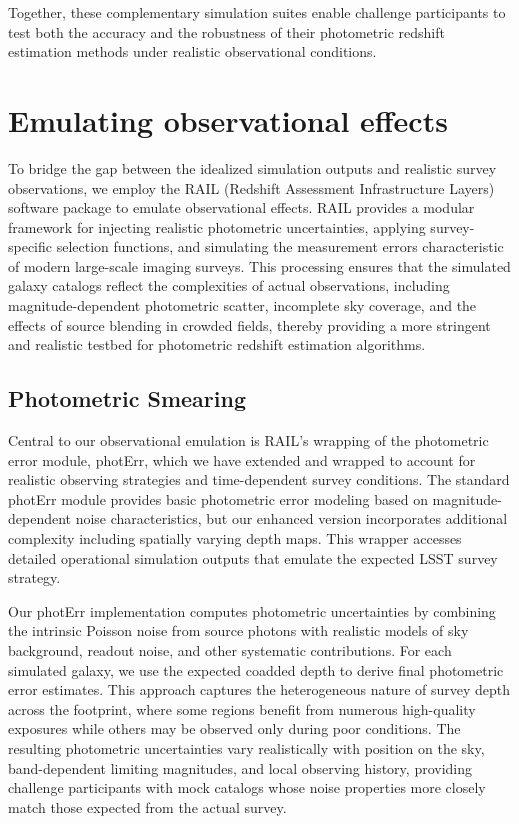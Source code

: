 \documentclass[11pt,twoside,letterpaper,onecolumn,english]{article}
\begin{document}
Together, these complementary simulation suites enable challenge
participants to test both the accuracy and the robustness of their
photometric redshift estimation methods under realistic observational
conditions.


\section{Emulating observational effects}
\label{sec:emulating_observations}

To bridge the gap between the idealized simulation outputs and
realistic survey observations, we employ the RAIL (Redshift Assessment
Infrastructure Layers) software package to emulate observational
effects. RAIL provides a modular framework for injecting realistic
photometric uncertainties, applying survey-specific selection
functions, and simulating the measurement errors characteristic of
modern large-scale imaging surveys. This processing ensures that the
simulated galaxy catalogs reflect the complexities of actual
observations, including magnitude-dependent photometric scatter,
incomplete sky coverage, and the effects of source blending in crowded
fields, thereby providing a more stringent and realistic testbed for
photometric redshift estimation algorithms.


\subsection{Photometric Smearing}

Central to our observational emulation is RAIL's wrapping of the
photometric error module, photErr, which we have extended and wrapped
to account for realistic observing strategies and time-dependent
survey conditions. The standard photErr module provides basic
photometric error modeling based on magnitude-dependent noise
characteristics, but our enhanced version incorporates additional
complexity including spatially varying depth maps. This
wrapper accesses detailed operational simulation outputs that emulate
the expected LSST survey strategy.

Our photErr implementation computes photometric uncertainties by
combining the intrinsic Poisson noise from source photons with
realistic models of sky background, readout noise, and other
systematic contributions. For each simulated galaxy, we use the expected
coadded depth to derive final photometric error estimates. This
approach captures the heterogeneous nature of survey depth across the
footprint, where some regions benefit from numerous high-quality
exposures while others may be observed only during poor
conditions. The resulting photometric uncertainties vary realistically
with position on the sky, band-dependent limiting magnitudes, and
local observing history, providing challenge participants with mock
catalogs whose noise properties more closely match those expected from
the actual survey.
\end{document}
